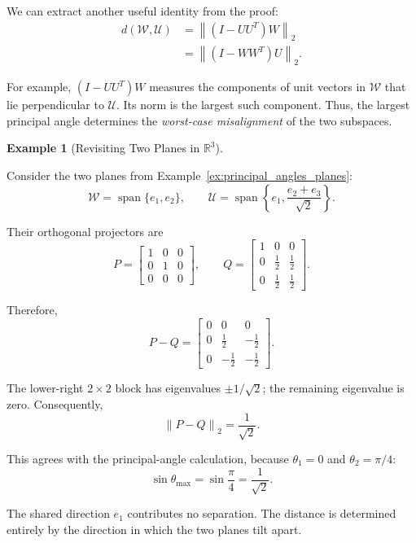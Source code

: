 \documentclass[14pt,letterpaper]{article}
\theoremstyle{plain}
\theoremstyle{definition}
\newtheorem{example}[theorem]{Example}
\theoremstyle{remark}
\newcommand{\R}{\mathbb{R}}
\newcommand{\norm}[1]{\left\lVert #1 \right\rVert}
\DeclareMathOperator{\Span}{span}
\begin{document}
We can extract another useful identity from the proof:
\[
\boxed{
\begin{aligned}
d(\mathcal W,\mathcal U)
&=\norm{(I-UU^T)W}_2\\
&=\norm{(I-WW^T)U}_2.
\end{aligned}
}
\]

For example, $(I-UU^T)W$ measures the components of
unit vectors in $\mathcal W$ that lie perpendicular
to $\mathcal U$. Its norm is the largest such component.
Thus, the largest principal angle determines the
\emph{worst-case misalignment} of the two subspaces.

\begin{example}[Revisiting Two Planes in $\R^3$]
\label{ex:projection_distance_planes}

Consider the two planes from
Example~\ref{ex:principal_angles_planes}:
\[
\mathcal W=\Span\{e_1,e_2\},
\qquad
\mathcal U=\Span\left\{e_1,\frac{e_2+e_3}{\sqrt2}\right\}.
\]

Their orthogonal projectors are
\[
P=\begin{bmatrix}
1&0&0\\
0&1&0\\
0&0&0
\end{bmatrix},
\qquad
Q=\begin{bmatrix}
1&0&0\\
0&\tfrac12&\tfrac12\\
0&\tfrac12&\tfrac12
\end{bmatrix}.
\]

Therefore,
\[
P-Q=\begin{bmatrix}
0&0&0\\
0&\tfrac12&-\tfrac12\\
0&-\tfrac12&-\tfrac12
\end{bmatrix}.
\]

The lower-right $2\times2$ block has eigenvalues
$\pm1/\sqrt2$; the remaining eigenvalue is zero.
Consequently,
\[
\boxed{\norm{P-Q}_2=\frac1{\sqrt2}.}
\]

This agrees with the principal-angle calculation,
because $\theta_1=0$ and $\theta_2=\pi/4$:
\[
\boxed{
\sin\theta_{\max}=\sin\frac\pi4=\frac1{\sqrt2}.
}
\]

The shared direction $e_1$ contributes no separation.
The distance is determined entirely by the direction
in which the two planes tilt apart.

\end{example}
\end{document}
